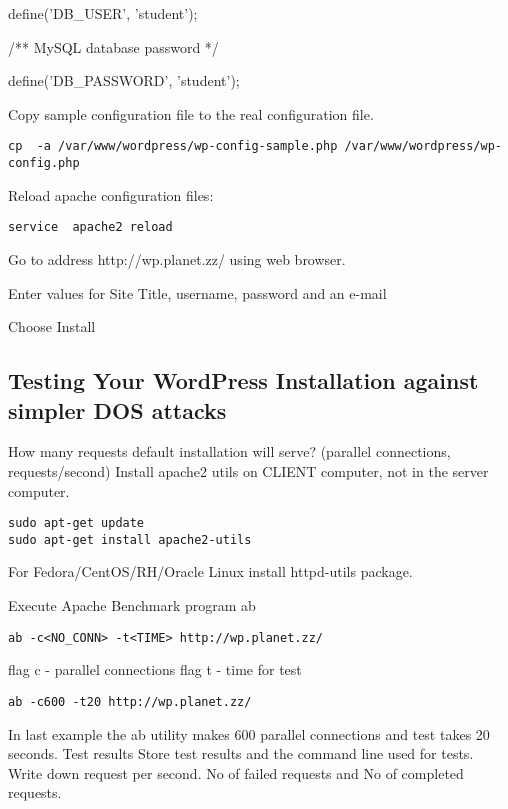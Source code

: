 define('DB\_USER', 'student');

/** MySQL database password */

define('DB\_PASSWORD', 'student');


Copy sample configuration file to the real configuration file.
\begin{verbatim}
cp  -a /var/www/wordpress/wp-config-sample.php /var/www/wordpress/wp-config.php
\end{verbatim}

Reload apache configuration files:
\begin{verbatim}
service  apache2 reload
\end{verbatim}

Go to address http://wp.planet.zz/ using web browser.

Enter values for  Site Title, username, password and an e-mail

Choose Install

\subsection{Testing Your WordPress Installation against simpler DOS attacks}


How many requests default installation will serve? (parallel connections, requests/second)
Install apache2 utils on CLIENT computer, not in the server computer.

\begin{verbatim}
sudo apt-get update
sudo apt-get install apache2-utils
\end{verbatim}

For Fedora/CentOS/RH/Oracle Linux install httpd-utils package.

Execute Apache Benchmark program ab
\begin{verbatim}
ab -c<NO_CONN> -t<TIME> http://wp.planet.zz/
\end{verbatim}
flag c - parallel connections
flag t - time for test

\begin{verbatim}
ab -c600 -t20 http://wp.planet.zz/
\end{verbatim}

In last example the ab utility makes 600 parallel connections and test takes 20 seconds.
Test results
Store test results and the command line used for tests.
Write down request per second. No of failed requests and No of completed requests.

